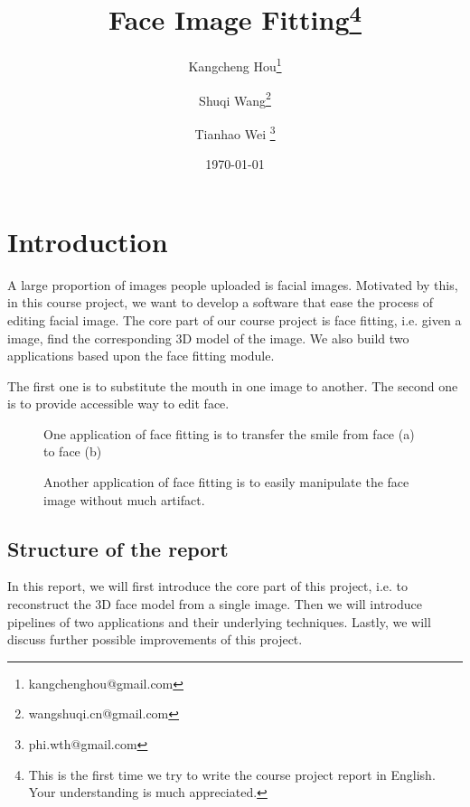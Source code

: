 \documentclass{article}
\title{Face Image Fitting\footnote{This is the first time we try to write the course project report in English. Your understanding is much appreciated.}}
\author{Kangcheng Hou\footnote{kangchenghou@gmail.com} \and Shuqi Wang\footnote{wangshuqi.cn@gmail.com} \and Tianhao Wei \footnote{phi.wth@gmail.com}}
\date{\today}
\begin{document}
\maketitle
\tableofcontents

\section{Introduction}
A large proportion of images people uploaded is facial images. Motivated by this, in this course project, we want to develop a software that ease the process of editing facial image. The core part of our course project is face fitting, i.e. given a image, find the corresponding 3D model of the image. We also build two applications based upon the face fitting module.

The first one is to substitute the mouth in one image to another. The second one is to provide accessible way to edit face.
\begin{figure}
    \centering
    \hfill
    \caption{One application of face fitting is to transfer the smile from face (a) to face (b)}
\end{figure}
\begin{figure}
    \centering
    \hfill
    \caption{Another application of face fitting is to easily manipulate the face image without much artifact.}
\end{figure}

\subsection{Structure of the report}
In this report, we will first introduce the core part of this project, i.e. to reconstruct the 3D face model from a single image. Then we will introduce pipelines of two applications and their underlying techniques. Lastly, we will discuss further possible improvements of this project.
     

% 



\end{document}
